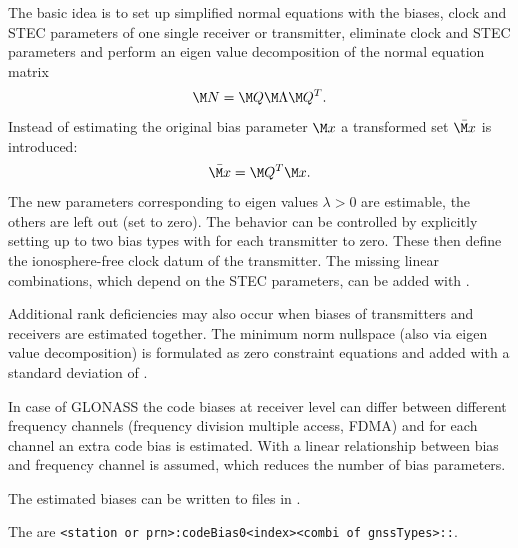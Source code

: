 The basic idea is to set up simplified normal equations with the biases,
clock and STEC parameters of one single receiver or transmitter,
eliminate clock and STEC parameters and perform an eigen value decomposition
of the normal equation matrix
\begin{equation}
  \M N = \M Q \M\Lambda \M Q^T.
\end{equation}
Instead of estimating the original bias parameter $\M x$ a transformed set $\bar{\M x}$
is introduced:
\begin{equation}
  \bar{\M x} = \M Q^T \M x.
\end{equation}
The new parameters corresponding to eigen values $\lambda>0$ are estimable,
the others are left out (set to zero). The behavior can be controlled by explicitly setting up to two bias types
with  for each transmitter to zero. These then define the ionosphere-free clock datum
of the transmitter. The missing linear combinations,
which depend on the STEC parameters, can be added with
.

Additional rank deficiencies may also occur when biases of transmitters and receivers are estimated together.
The minimum norm nullspace (also via eigen value decomposition)
is formulated as zero constraint equations and added with a standard deviation of .

In case of GLONASS the code biases at receiver level can differ between different frequency channels
(frequency division multiple access, FDMA) and for each channel an extra code bias is estimated.
With  a linear relationship between bias and frequency channel is assumed,
which reduces the number of bias parameters.

The estimated biases can be written to files in
.

The  are \verb|<station or prn>:codeBias0<index><combi of gnssTypes>::|.


